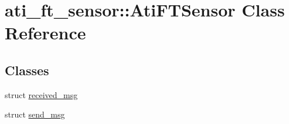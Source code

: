 \hypertarget{classati__ft__sensor_1_1AtiFTSensor}{}\section{ati\+\_\+ft\+\_\+sensor\+:\+:Ati\+F\+T\+Sensor Class Reference}
\label{classati__ft__sensor_1_1AtiFTSensor}
\subsection*{Classes}
\begin{DoxyCompactItemize}
\item 
struct \hyperlink{structati__ft__sensor_1_1AtiFTSensor_1_1received__msg}{received\+\_\+msg}
\item 
struct \hyperlink{structati__ft__sensor_1_1AtiFTSensor_1_1send__msg}{send\+\_\+msg}
\end{DoxyCompactItemize}
